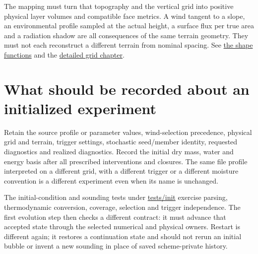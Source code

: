 The mapping must turn that topography and the vertical grid into positive
physical layer volumes and compatible face metrics. A wind tangent to a slope,
an environmental profile sampled at the actual height, a surface flux per true
area and a radiation shadow are all consequences of the same terrain geometry.
They must not each reconstruct a different terrain from nominal spacing.
See \href{../src/terrain/base/topography.cpp}{the shape functions} and the
\hyperref[grid-deep-dive]{detailed grid chapter}.

\section{What should be recorded about an initialized experiment}

Retain the source profile or parameter values, wind-selection precedence,
physical grid and terrain, trigger settings, stochastic seed/member identity,
requested diagnostics and realized diagnostics. Record the initial dry mass,
water and energy basis after all prescribed interventions and closures. The
same file profile interpreted on a different grid, with a different trigger or
a different moisture convention is a different experiment even when its name
is unchanged.

The initial-condition and sounding tests under
\href{../tests/init}{tests/init} exercise parsing, thermodynamic conversion,
coverage, selection and trigger independence. The first evolution step then
checks a different contract: it must advance that accepted state through the
selected numerical and physical owners. Restart is different again; it restores
a continuation state and should not rerun an initial bubble or invent a new
sounding in place of saved scheme-private history.
